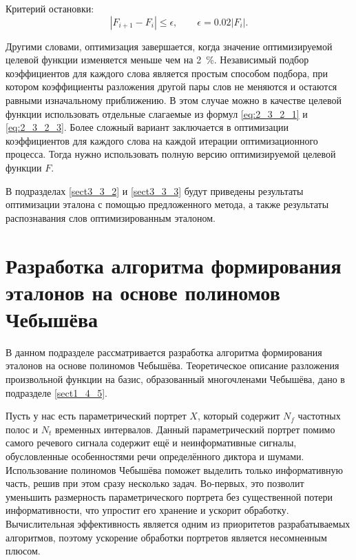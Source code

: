 Критерий остановки:
\begin{equation} \label{eq:2_3_2_5}
|F_{i+1} - F_i| \le \epsilon,\qquad \epsilon = 0.02 |F_i|.
\end{equation}

Другими словами, оптимизация завершается, когда значение оптимизируемой целевой функции изменяется меньше чем на 2~\%.
Независимый подбор коэффициентов для каждого слова является простым способом подбора, при котором коэффициенты разложения другой пары слов не меняются и остаются равными изначальному приближению.
В этом случае можно в качестве целевой функции использовать отдельные слагаемые из формул \eqref{eq:2_3_2_1} и \eqref{eq:2_3_2_3}.
Более сложный вариант заключается в оптимизации коэффициентов для каждого слова на каждой итерации оптимизационного процесса.
Тогда нужно использовать полную версию оптимизируемой целевой функции $F$.

В подразделах \ref{sect3_3_2} и \ref{sect3_3_3} будут приведены результаты оптимизации эталона с помощью предложенного метода, а также результаты распознавания слов оптимизированным эталоном.


\section{Разработка алгоритма формирования эталонов на основе полиномов Чебышёва} \label{sect2_4}

В данном подразделе рассматривается разработка алгоритма формирования эталонов на основе полиномов Чебышёва.
Теоретическое описание разложения произвольной функции на базис, образованный многочленами Чебышёва, дано в подразделе \ref{sect1_4_5}.

Пусть у нас есть параметрический портрет $X$, который содержит $N_f$ частотных полос и $N_t$ временных интервалов.
Данный параметрический портрет помимо самого речевого сигнала содержит ещё и неинформативные сигналы, обусловленные особенностями речи определённого диктора и шумами.
Использование полиномов Чебышёва поможет выделить только информативную часть, решив при этом сразу несколько задач.
Во-первых, это позволит уменьшить размерность параметрического портрета без существенной потери информативности, что упростит его хранение и ускорит обработку.
Вычислительная эффективность является одним из приоритетов разрабатываемых алгоритмов, поэтому ускорение обработки портретов является несомненным плюсом.


